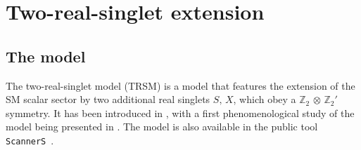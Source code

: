 \section{Two-real-singlet extension}\label{sec:2rs}
\subsection{The model}
The two-real-singlet model (TRSM) is a model that features the extension of the SM scalar sector by two additional real singlets $S,\,X$, which obey a $\mathbb{Z}_2\,\otimes\,\mathbb{Z}_2'$ symmetry. It has been introduced in \cite{Robens:2019kga}, with a first phenomenological study of the model being presented in \cite{Papaefstathiou:2020lyp}. The model is also available in the public tool \texttt{ScannerS}~\cite{Coimbra:2013qq,Costa:2015llh,Muhlleitner:2020wwk}.

